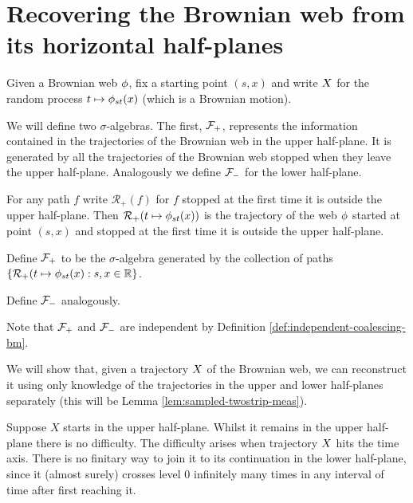 {
\section{Recovering the Brownian web from its horizontal half-planes}

\label{recovering-from-half-planes}

\begin{notation}
Given a Brownian web $\phi$, fix a starting point $(s,x)$ and write
$X$ for the random process $t \mapsto \phi_{{s}{t}}(x)$
(which is a Brownian motion).
\end{notation}

\newcommand{\restrictupper}{\mathcal{R}_{+}}

We will define two $\sigma$-algebras.  The first, $\mathcal{F}_{+}$,
represents the information contained in the trajectories of the
Brownian web in the upper half-plane.  It is generated by all the
trajectories of the Brownian web stopped when they leave the upper
half-plane.  Analogously we define $\mathcal{F}_{-}$ for the lower
half-plane.

\begin{definition}
  For any path $f$ write $\restrictupper(f)$ for $f$ stopped at the
  first time it is outside the upper half-plane.  Then
  $\restrictupper(t \mapsto \web{s}{t}{x})$ is the trajectory of the
  web $\phi$ started at point $(s,x)$ and stopped at the first
  time it is outside the upper half-plane.

  Define $\mathcal{F}_{+}$ to be the $\sigma$-algebra generated by the
  collection of paths $\{\restrictupper(t \mapsto \web{s}{t}{x} : s,x
  \in \R \}$.

  Define $\mathcal{F}_{-}$ analogously.
\end{definition}

\begin{observation}
  Note that $\mathcal{F}_{+}$ and $\mathcal{F}_{-}$ are independent by Definition
  \ref{def:independent-coalescing-bm}.
\end{observation}

We will show that, given a trajectory $X$ of the Brownian web,
we can reconstruct it using only knowledge of the trajectories in the
upper and lower half-planes separately (this will be Lemma
\ref{lem:sampled-twostrip-meas}).

Suppose $X$ starts in the upper half-plane.  Whilst it remains in the upper
half-plane there is no difficulty.
The difficulty arises when trajectory $X$
hits the time axis.  There is no finitary way to join
it to its continuation in the lower half-plane, since it (almost
surely) crosses level $0$ infinitely many times in any interval of
time after first reaching it.

}
